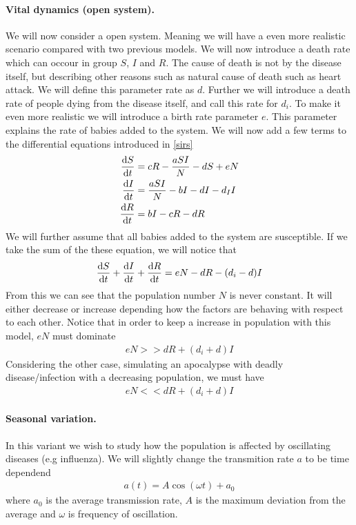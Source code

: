 \documentclass[a4paper, 10pt]{article}
\begin{document}
\paragraph{Vital dynamics (open system).}\label{sec:SIRS2} We will now consider a open system. Meaning
we will have a even more realistic scenario compared with two previous models. We will now introduce
a death rate which can occour in group $S$, $I$ and $R$. The cause of death is not by the disease itself, but describing
other reasons such as natural cause of death such as heart attack. We will define this parameter rate as
$d$. Further we will introduce a death rate of people dying from the disease itself, and call this rate for $d_{i}$.
To make it even more realistic we will introduce a birth rate parameter $e$. This parameter explains the rate of babies added to the system.
We will now add a few terms to the differential equations introduced in \eqref{sirs}
\begin{align*}
  \dv{S}{t} &= cR - \frac{aSI}{N} - dS + eN\\
  \dv{I}{t} &= \frac{aSI}{N} - bI - dI - d_{I}I\\
  \dv{R}{t} &= bI - cR - dR
\end{align*}
We will further assume that all babies added to the system are susceptible.
If we take the sum of the these equation, we will notice that
\begin{align}
\dv{S}{t} + \dv{I}{t} + \dv{R}{t} = eN - dR - (d_{i} - d)I
\end{align}
From this we can see that the population number $N$ is never constant. It will either decrease or increase depending how the
factors are behaving with respect to each other.
Notice that in order to keep a increase in population with this model, $eN$ must dominate
\begin{align}
  eN >> dR + (d_{i} + d)I
\end{align}
Considering the other case, simulating an apocalypse with deadly disease/infection with a decreasing population, we must have
\begin{align}
  eN << dR + (d_{i} + d)I
\end{align}
\paragraph{Seasonal variation.}\label{sec:SIRS3} In this variant we wish to study how the
population is affected by oscillating diseases (e.g influenza). We will
slightly change the transmition rate $a$ to be time dependend
\begin{align*}
  a(t) = A\cos{(\omega t)} + a_{0}
\end{align*}
where $a_{0}$ is the average transmission rate, $A$ is the maximum deviation
from the average and $\omega$ is frequency of oscillation.
\end{document}
